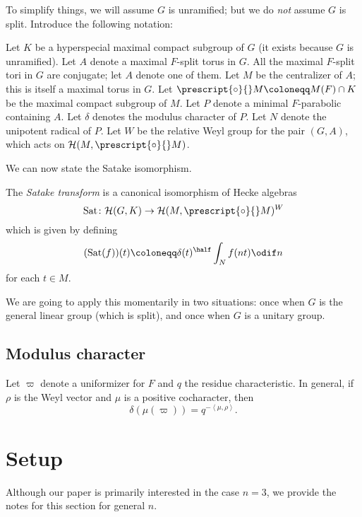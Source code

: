To simplify things, we will assume $G$ is unramified;
but we do \emph{not} assume $G$ is split.
Introduce the following notation:
\begin{itemize}
  \ii Let $K$ be a hyperspecial maximal compact subgroup of $G$
  (it exists because $G$ is unramified).
  \ii Let $A$ denote a maximal $F$-split torus in $G$.
  All the maximal $F$-split tori in $G$ are conjugate; let $A$ denote one of them.
  \ii Let $M$ be the centralizer of $A$; this is itself a maximal torus in $G$.
  \ii Let $\prescript{\circ}{} M \coloneqq M(F) \cap K$
  be the maximal compact subgroup of $M$.
  \ii Let $P$ denote a minimal $F$-parabolic containing $A$.
  \ii Let $\delta$ denotes the modulus character of $P$.
  \ii Let $N$ denote the unipotent radical of $P$.
  \ii Let $W$ be the relative Weyl group for the pair $(G,A)$,
  which acts on $\HH(M, \prescript{\circ}{} M)$.
\end{itemize}
We can now state the Satake isomorphism.
\begin{definition}
  The \emph{Satake transform} is a canonical isomorphism of Hecke algebras
  \[ \Sat \colon \HH(G, K) \to \HH(M, \prescript{\circ}{} M)^W \]
  which is given by defining
  \[ (\Sat(f))(t) \coloneqq \delta(t)^\half \int_N f(nt) \odif n  \]
  for each $t \in M$.
\end{definition}
We are going to apply this momentarily in two situations:
once when $G$ is the general linear group (which is split),
and once when $G$ is a unitary group.

\subsection{Modulus character}
Let $\varpi$ denote a uniformizer for $F$ and $q$ the residue characteristic.
In general, if $\rho$ is the Weyl vector and $\mu$ is a positive cocharacter, then
\[ \delta(\mu(\varpi)) = q^{- \left< \mu, \rho\right>}. \]

\section{Setup}
Although our paper is primarily interested in the case $n=3$,
we provide the notes for this section for general $n$.

